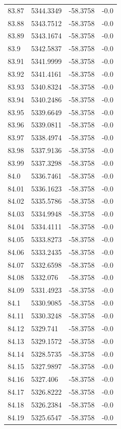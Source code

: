 \begin{table}[H]
\begin{tabular}{llll}
83.87 & 5344.3349 & -58.3758 & -0.0 \\
83.88 & 5343.7512 & -58.3758 & -0.0 \\
83.89 & 5343.1674 & -58.3758 & -0.0 \\
83.9 & 5342.5837 & -58.3758 & -0.0 \\
83.91 & 5341.9999 & -58.3758 & -0.0 \\
83.92 & 5341.4161 & -58.3758 & -0.0 \\
83.93 & 5340.8324 & -58.3758 & -0.0 \\
83.94 & 5340.2486 & -58.3758 & -0.0 \\
83.95 & 5339.6649 & -58.3758 & -0.0 \\
83.96 & 5339.0811 & -58.3758 & -0.0 \\
83.97 & 5338.4974 & -58.3758 & -0.0 \\
83.98 & 5337.9136 & -58.3758 & -0.0 \\
83.99 & 5337.3298 & -58.3758 & -0.0 \\
84.0 & 5336.7461 & -58.3758 & -0.0 \\
84.01 & 5336.1623 & -58.3758 & -0.0 \\
84.02 & 5335.5786 & -58.3758 & -0.0 \\
84.03 & 5334.9948 & -58.3758 & -0.0 \\
84.04 & 5334.4111 & -58.3758 & -0.0 \\
84.05 & 5333.8273 & -58.3758 & -0.0 \\
84.06 & 5333.2435 & -58.3758 & -0.0 \\
84.07 & 5332.6598 & -58.3758 & -0.0 \\
84.08 & 5332.076 & -58.3758 & -0.0 \\
84.09 & 5331.4923 & -58.3758 & -0.0 \\
84.1 & 5330.9085 & -58.3758 & -0.0 \\
84.11 & 5330.3248 & -58.3758 & -0.0 \\
84.12 & 5329.741 & -58.3758 & -0.0 \\
84.13 & 5329.1572 & -58.3758 & -0.0 \\
84.14 & 5328.5735 & -58.3758 & -0.0 \\
84.15 & 5327.9897 & -58.3758 & -0.0 \\
84.16 & 5327.406 & -58.3758 & -0.0 \\
84.17 & 5326.8222 & -58.3758 & -0.0 \\
84.18 & 5326.2384 & -58.3758 & -0.0 \\
84.19 & 5325.6547 & -58.3758 & -0.0 \\

\end{tabular}
\end{table}
